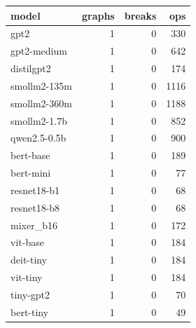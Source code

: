 \begin{tabular}{lrrr}
\toprule
model & graphs & breaks & ops \\
\midrule
gpt2 & 1 & 0 & 330 \\
gpt2-medium & 1 & 0 & 642 \\
distilgpt2 & 1 & 0 & 174 \\
smollm2-135m & 1 & 0 & 1116 \\
smollm2-360m & 1 & 0 & 1188 \\
smollm2-1.7b & 1 & 0 & 852 \\
qwen2.5-0.5b & 1 & 0 & 900 \\
bert-base & 1 & 0 & 189 \\
bert-mini & 1 & 0 & 77 \\
resnet18-b1 & 1 & 0 & 68 \\
resnet18-b8 & 1 & 0 & 68 \\
mixer\_b16 & 1 & 0 & 172 \\
vit-base & 1 & 0 & 184 \\
deit-tiny & 1 & 0 & 184 \\
vit-tiny & 1 & 0 & 184 \\
tiny-gpt2 & 1 & 0 & 70 \\
bert-tiny & 1 & 0 & 49 \\
\bottomrule
\end{tabular}
